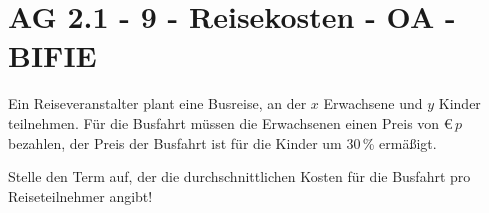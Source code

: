 \section{AG 2.1 - 9 - Reisekosten - OA - BIFIE}

\begin{beispiel}[AG 2.1]{1} %
Ein Reiseveranstalter plant eine Busreise, an der $x$ Erwachsene und $y$ Kinder teilnehmen.
Für die Busfahrt müssen die Erwachsenen einen Preis von \euro\,$p$ bezahlen, der Preis der Busfahrt ist für die Kinder um 30\,\% ermäßigt. 
 \leer

Stelle den Term auf, der die durchschnittlichen Kosten für die Busfahrt pro Reiseteilnehmer angibt!

			
\end{beispiel}